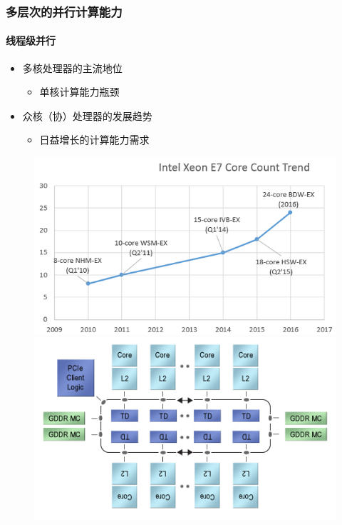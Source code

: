 \documentclass[aspectratio=169]{beamer}
\begin{document}
\begin{frame}
  \frametitle{多层次的并行计算能力}
  \framesubtitle{线程级并行}
  \begin{itemize}
  \item 多核处理器的主流地位
    \begin{itemize}
    \item 单核计算能力瓶颈
    \end{itemize}
  \item 众核（协）处理器的发展趋势
    \begin{itemize}
    \item 日益增长的计算能力需求
    \end{itemize}
  \end{itemize}
  \begin{figure}
    \includegraphics[width=.4\textwidth]{e7}\hspace{1cm}
    \includegraphics[width=.4\textwidth]{knc1}
  \end{figure}
\end{frame}
\end{document}
